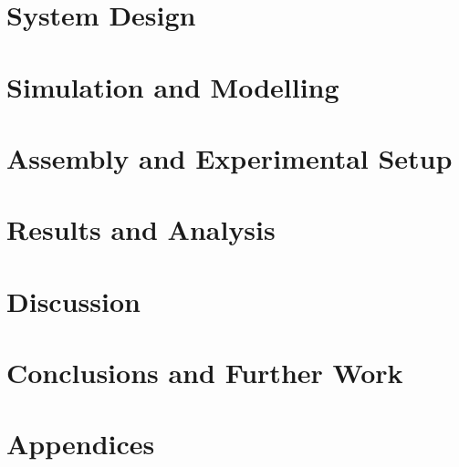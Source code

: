 \documentclass{l5eng}
\begin{document}
\chapter{System Design}



\chapter{Simulation and Modelling}



\chapter{Assembly and Experimental Setup}



\chapter{Results and Analysis}



\chapter{Discussion}



\chapter{Conclusions and Further Work}



\printbibliography[heading=bibintoc, title={References}]

\appendix
\chapter{Appendices}
%

%

%

%
\end{document}
